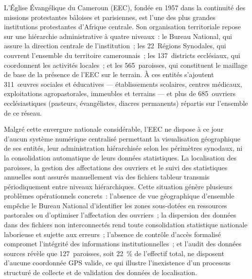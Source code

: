 \documentclass[12pt, a4paper]{report}
\begin{document}
L'Église Évangélique du Cameroun (EEC), fondée en 1957 dans la continuité des
missions protestantes bâloises et parisiennes, est l'une des plus grandes
institutions protestantes d'Afrique centrale. Son organisation territoriale
repose sur une hiérarchie administrative à quatre niveaux~: le Bureau National,
qui assure la direction centrale de l'institution~; les 22~Régions Synodales, qui
couvrent l'ensemble du territoire camerounais~; les 137~districts ecclésiaux, qui
coordonnent les activités locales~; et les 565~paroisses, qui constituent le
maillage de base de la présence de l'EEC sur le terrain. À ces entités s'ajoutent
311~œuvres sociales et éducatives --- établissements scolaires, centres médicaux,
exploitations agropastorales, immeubles et terrains --- et plus de
685~ouvriers ecclésiastiques (pasteurs, évangélistes, diacres permanents) répartis
sur l'ensemble de ce réseau.

Malgré cette envergure nationale considérable, l'EEC ne dispose à ce jour d'aucun
système numérique centralisé permettant la visualisation géographique de ses
entités, leur administration hiérarchisée selon les périmètres synodaux, ni la
consolidation automatique de leurs données statistiques. La localisation des
paroisses, la gestion des affectations des ouvriers et le suivi des statistiques
annuelles sont assurés manuellement via des fichiers tableur transmis
périodiquement entre niveaux hiérarchiques. Cette situation génère plusieurs
problèmes opérationnels concrets~: l'absence de vue géographique d'ensemble
empêche le Bureau National d'identifier les zones sous-dotées en ressources
pastorales ou d'optimiser l'affectation des ouvriers~; la dispersion des données
dans des fichiers non interconnectés rend toute consolidation statistique nationale
laborieuse et sujette aux erreurs~; l'absence de contrôle d'accès formalisé
compromet l'intégrité des informations institutionnelles~; et l'audit des données
sources révèle que 127~paroisses, soit 22~\% de l'effectif total, ne disposent
d'aucune coordonnée GPS valide, ce qui illustre l'inexistence d'un processus
structuré de collecte et de validation des données de localisation.
\end{document}
